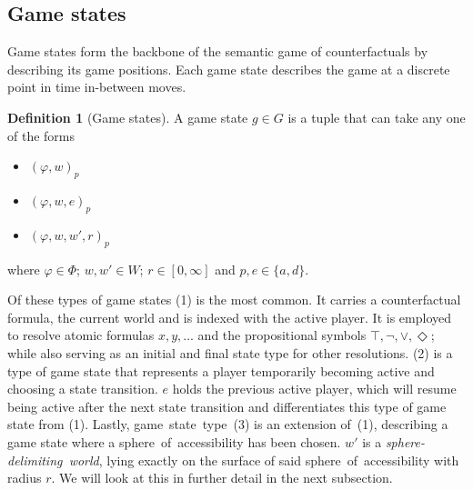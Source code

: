 \documentclass[a4paper,american,10pt]{paper}
\theoremstyle{definition}\newtheorem{definition}{Definition}
\begin{document}
\subsection{Game states}
Game states form the backbone of the semantic game of counterfactuals by describing its game positions. Each game state describes the game at a discrete point in time in-between moves.
\begin{definition}[Game states]
A game state $g\in G$ is a tuple that can take any one of the forms
\begin{itemize}
	\item[(1)] $(\varphi ,w)_p$
	\item[(2)] $(\varphi ,w, e)_p$
	\item[(3)] $(\varphi ,w,w',r)_p$
\end{itemize}
where $\varphi\in\Phi$; $w,w'\in W$; $r\in [0,\infty ]$ and $p,e\in\{ a,d\}$.
\end{definition}
\noindent Of these types of game states (1) is the most common. It carries a counterfactual formula, the current world and is indexed with the active player. It is employed to resolve atomic formulas $x,y,...$ and the propositional symbols $\top,\neg,\vee,\Diamond$; while also serving as an initial and final state type for other resolutions. (2) is a type of game state that represents a player temporarily becoming active and choosing a state transition. $e$ holds the previous active player, which will resume being active after the next state transition and differentiates this type of game state from (1). Lastly, game~state~type~(3) is an extension of~(1), describing a game state where a sphere~of~accessibility has been chosen. $w'$ is a \textit{sphere-delimiting~world}, lying exactly on the surface of said sphere~of~accessibility with radius $r$. We will look at this in further detail in the next subsection.\\
\end{document}
